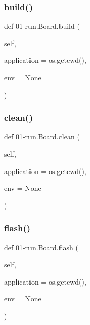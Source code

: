 \mbox{\label{class01-run_1_1Board_a7384c947a93c980b8930e253cb9492b6}} 
\subsubsection{\texorpdfstring{build()}{build()}}
{\footnotesize\ttfamily def 01-\/run.\+Board.\+build (\begin{DoxyParamCaption}\item[{}]{self,  }\item[{}]{application = {\ttfamily os.getcwd()},  }\item[{}]{env = {\ttfamily None} }\end{DoxyParamCaption})}

\mbox{\label{class01-run_1_1Board_a5208ba82fe3d549ad715f076f80e8a95}} 
\subsubsection{\texorpdfstring{clean()}{clean()}}
{\footnotesize\ttfamily def 01-\/run.\+Board.\+clean (\begin{DoxyParamCaption}\item[{}]{self,  }\item[{}]{application = {\ttfamily os.getcwd()},  }\item[{}]{env = {\ttfamily None} }\end{DoxyParamCaption})}

\mbox{\label{class01-run_1_1Board_a346a3b43b4c418d28e45b4d12c21daa9}} 
\subsubsection{\texorpdfstring{flash()}{flash()}}
{\footnotesize\ttfamily def 01-\/run.\+Board.\+flash (\begin{DoxyParamCaption}\item[{}]{self,  }\item[{}]{application = {\ttfamily os.getcwd()},  }\item[{}]{env = {\ttfamily None} }\end{DoxyParamCaption})}

